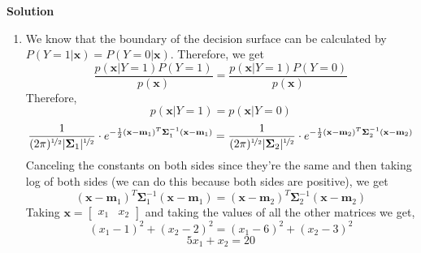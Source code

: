 \documentclass[twoside]{article}
\begin{document}
\textbf{Solution}
\begin{enumerate}
	\item
	We know that the boundary of the decision surface can be calculated by $P(Y=1|\mathbf{x})=P(Y=0|\mathbf{x})$.
	Therefore, we get
	\begin{equation*}
		\frac{p(\mathbf{x}|Y=1)P(Y=1)}{p(\mathbf{x})} = \frac{p(\mathbf{x}|Y=1)P(Y=0)}{p(\mathbf{x})}
	\end{equation*}
	Therefore,
	\begin{equation*}
		p(\mathbf{x}|Y=1) = p(\mathbf{x}|Y=0)
	\end{equation*}
	\begin{equation*}
		\frac{1}{(2\pi)^{\nicefrac{1}{2}} |\mathbf{\Sigma}_{1}|^{\nicefrac{1}{2}}}\cdot e^{-\frac{1}{2}(\mathbf{x}-\mathbf{m}_{1})^{T}\mathbf{\Sigma}_{1}^{-1}(\mathbf{x}-\mathbf{m}_{1})} = \frac{1}{(2\pi)^{\nicefrac{1}{2}} |\mathbf{\Sigma}_{2}|^{\nicefrac{1}{2}}}\cdot e^{-\frac{1}{2}(\mathbf{x}-\mathbf{m}_{2})^{T}\mathbf{\Sigma}_{2}^{-1}(\mathbf{x}-\mathbf{m}_{2})}
	\end{equation*}
	Canceling the constants on both sides since they're the same and then taking log of both sides (we can do this because both sides are positive), we get
	\begin{equation*}
		(\mathbf{x}-\mathbf{m}_{1})^{T}\mathbf{\Sigma}_{1}^{-1}(\mathbf{x}-\mathbf{m}_{1}) = (\mathbf{x}-\mathbf{m}_{2})^{T}\mathbf{\Sigma}_{2}^{-1}(\mathbf{x}-\mathbf{m}_{2})
	\end{equation*}
	Taking $\mathbf{x} = \begin{bmatrix} x_1 & x_2 \end{bmatrix}$ and taking the values of all the other matrices we get,
	\begin{equation*}
		(x_1 - 1)^2 + (x_2 - 2)^2 = (x_1 - 6)^2 + (x_2 - 3)^2
	\end{equation*}
	\begin{equation*}
		5x_1 + x_2 = 20
	\end{equation*}
	

\end{enumerate}
\end{document}
